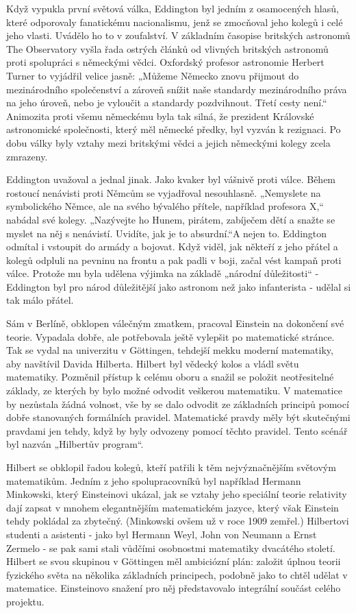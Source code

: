   Když vypukla první světová válka, Eddington byl jedním z osamocených hlasů, které odporovaly
  fanatickému nacionalismu, jenž se zmocňoval jeho kolegů i celé jeho vlasti. Uvádělo ho to v
  zoufalství. V základním časopise britských astronomů The Observatory vyšla řada ostrých článků od
  vlivných britských astronomů proti spolupráci s německými vědci. Oxfordský profesor astronomie
  Herbert Turner to vyjádřil velice jasně: „Můžeme Německo znovu přijmout do mezinárodního
  společenství a zároveň snížit naše standardy mezinárodního práva na jeho úroveň, nebo je vyloučit
  a standardy pozdvihnout. Třetí cesty není.“ Animozita proti všemu německému byla tak silná, že
  prezident Královské astronomické společnosti, který měl německé předky, byl vyzván k rezignaci. Po
  dobu války byly vztahy mezi britskými vědci a jejich německými kolegy zcela zmrazeny. 
  
  Eddington uvažoval a jednal jinak. Jako kvaker byl vášnivě proti válce. Během rostoucí nenávisti
  proti Němcům se vyjadřoval nesouhlasně. „Nemyslete na symbolického Němce, ale na svého bývalého
  přítele, například profesora X,“ nabádal své kolegy. „Nazývejte ho Hunem, pirátem, zabíječem dětí
  a snažte se myslet na něj s nenávistí. Uvidíte, jak je to absurdní.“A nejen to. Eddington odmítal
  i vstoupit do armády a bojovat. Když viděl, jak někteří z jeho přátel a kolegů odpluli na pevninu
  na frontu a pak padli v boji, začal vést kampaň proti válce. Protože mu byla udělena výjimka na
  základě „národní důležitosti“ - Eddington byl pro národ důležitější jako astronom než jako
  infanterista - udělal si tak málo přátel. 
  
  Sám v Berlíně, obklopen válečným zmatkem, pracoval Einstein na dokončení své teorie. Vypadala
  dobře, ale potřebovala ještě vylepšit po matematické stránce. Tak se vydal na univerzitu v
  Göttingen, tehdejší mekku moderní matematiky, aby navštívil Davida Hilberta. Hilbert byl vědecký
  kolos a vládl světu matematiky. Pozměnil přístup k celému oboru a snažil se položit neotřesitelné
  základy, ze kterých by bylo možné odvodit veškerou matematiku. V matematice by nezůstala žádná
  volnost, vše by se dalo odvodit ze základních principů pomocí dobře stanovaných formálních
  pravidel. Matematické pravdy měly být skutečnými pravdami jen tehdy, když by byly odvozeny pomocí
  těchto pravidel. Tento scénář byl nazván „Hilbertův program“. 
  
  Hilbert se obklopil řadou kolegů, kteří patřili k těm nejvýznačnějším světovým matematikům. Jedním
  z jeho spolupracovníků byl například Hermann Minkowski, který Einsteinovi ukázal, jak se vztahy
  jeho speciální teorie relativity dají zapsat v mnohem elegantnějším matematickém jazyce, který
  však Einstein tehdy pokládal za zbytečný. (Minkowski ovšem už v roce 1909 zemřel.) Hilbertovi
  studenti a asistenti - jako byl Hermann Weyl, John von Neumann a Ernst Zermelo - se pak sami stali
  vůdčími osobnostmi matematiky dvacátého století. Hilbert se svou skupinou v Göttingen měl
  ambiciózní plán: založit úplnou teorii fyzického světa na několika základních principech, podobně
  jako to chtěl udělat v matematice. Einsteinovo snažení pro něj představovalo integrální součást
  celého projektu. 
  
